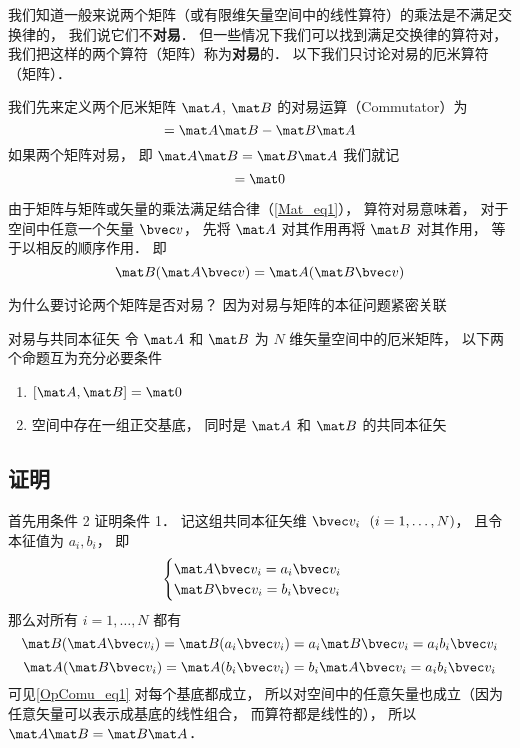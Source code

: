 

我们知道一般来说两个矩阵（或有限维矢量空间中的线性算符）的乘法是不满足交换律的， 我们说它们不\textbf{对易}． 但一些情况下我们可以找到满足交换律的算符对， 我们把这样的两个算符（矩阵）称为\textbf{对易}的． 以下我们只讨论对易的厄米算符（矩阵）．

我们先来定义两个厄米矩阵 $\mat A$, $\mat B$ 的对易运算（Commutator）为
\begin{equation}
[\mat A, \mat B] = \mat A \mat B - \mat B \mat A
\end{equation}
如果两个矩阵对易， 即 $\mat A \mat B = \mat B \mat A$ 我们就记
\begin{equation}
[\mat A, \mat B] = \mat 0
\end{equation}

由于矩阵与矩阵或矢量的乘法满足结合律（\autoref{Mat_eq1}）， 算符对易意味着， 对于空间中任意一个矢量 $\bvec v$， 先将 $\mat A$ 对其作用再将 $\mat B$ 对其作用， 等于以相反的顺序作用． 即
\begin{equation}\label{OpComu_eq1}
\mat B(\mat A \bvec v) = \mat A (\mat B \bvec v)
\end{equation}

为什么要讨论两个矩阵是否对易？ 因为对易与矩阵的本征问题紧密关联

\begin{theorem}{对易与共同本征矢}
令 $\mat A$ 和 $\mat B$ 为 $N$ 维矢量空间中的厄米矩阵， 以下两个命题互为充分必要条件
\begin{enumerate}
\item $[\mat A, \mat B] = \mat 0$
\item 空间中存在一组正交基底， 同时是 $\mat A$ 和 $\mat B$ 的共同本征矢
\end{enumerate}
\end{theorem}

\subsection{证明}
首先用条件 2 证明条件 1． 记这组共同本征矢维 $\bvec v_i \ \ (i = 1, \dots , N)$， 且令本征值为 $a_i, b_i$， 即
\begin{equation}
\begin{cases}
\mat A \bvec v_i = a_i \bvec v_i\\
\mat B \bvec v_i = b_i \bvec v_i
\end{cases}
\end{equation}
那么对所有 $i = 1, \dots, N$ 都有
\begin{equation}
\mat B (\mat A \bvec v_i) = \mat B (a_i \bvec v_i) = a_i \mat B \bvec v_i = a_i b_i \bvec v_i
\end{equation}
\begin{equation}
\mat A (\mat B \bvec v_i) = \mat A (b_i \bvec v_i) = b_i \mat A \bvec v_i = a_i b_i \bvec v_i
\end{equation}
可见\autoref{OpComu_eq1} 对每个基底都成立， 所以对空间中的任意矢量也成立（因为任意矢量可以表示成基底的线性组合， 而算符都是线性的）， 所以 $\mat A \mat B = \mat B \mat A$．

